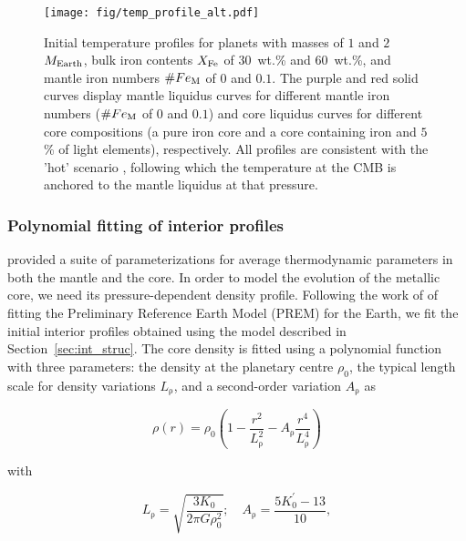 \documentclass[draft]{agujournal2019} %
\begin{document}
\begin{figure}[t]
\texttt{[image: fig/temp\_profile\_alt.pdf]}
\caption{Initial temperature profiles for planets with masses of $1$ and $2$~$M_{\rm Earth}$, bulk iron contents $X_{\rm Fe}$ of $30$~wt.\% and $60$~wt.\%, and mantle iron numbers $\#Fe_{\rm M}$ of $0$ and $0.1$. The purple and red solid curves display mantle liquidus curves for different mantle iron numbers ($\#Fe_{\rm M}$ of $0$ and $0.1$) and core liquidus curves for different core compositions (a pure iron core and a core containing iron and $5$\% of light elements), respectively. All profiles are consistent with the 'hot' scenario \cite{noacklasbleis_2020}, following which the temperature at the CMB is anchored to the mantle liquidus at that pressure.}
\label{fig:temp_profiles}
\end{figure}

\subsubsection{Polynomial fitting of interior profiles}

 provided a suite of parameterizations for average thermodynamic parameters in both the mantle and the core. In order to model the evolution of the metallic core, we need its pressure-dependent density profile. Following the work of  of fitting the Preliminary Reference Earth Model (PREM) for the Earth, we fit the initial interior profiles obtained using the model described in Section~\ref{sec:int_struc}. The core density is fitted using a polynomial function with three parameters: the density at the planetary centre $\rho_{\mathrm{0}}$, the typical length scale for density variations $L_{\mathrm{\rho}}$, and a second-order variation $A_{\mathrm{\rho}}$ as

\begin{linenomath*}
\begin{equation}\label{eq:density}
    \rho(r) = \rho_{\mathrm{0}}\left ( 1-\frac{r^2}{L_{\mathrm{\rho}} ^2} - A_{\mathrm{\rho}} \frac{r^4}{L_{\mathrm{\rho}}^4}\right )
\end{equation}
\end{linenomath*}

with

\begin{linenomath*}
\begin{equation}
	L_{\mathrm{\rho}}=\sqrt{\frac{3 K_{\mathrm{0}}}{2 \pi G \rho_{\mathrm{0}}^{2}}} ; \quad A_{\mathrm{\rho}}=\frac{5 K_{\mathrm{0}}^{\prime}-13}{10},
\end{equation}
\end{linenomath*}
\end{document}
